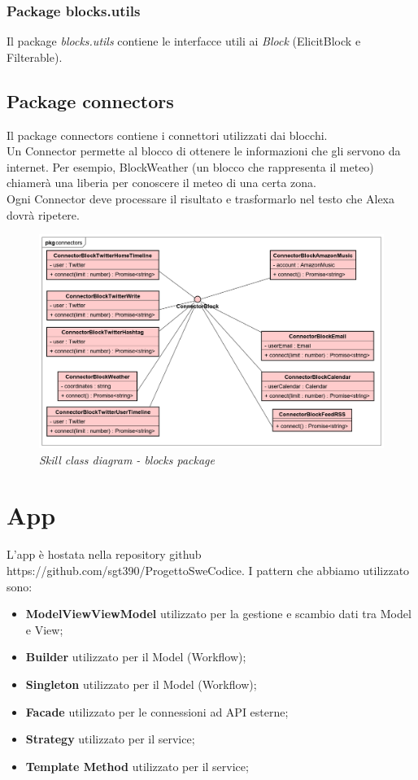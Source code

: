 \subsubsection{Package blocks.utils}
Il package \textit{blocks.utils} contiene le interfacce utili ai \textit{Block} (ElicitBlock e Filterable).
\subsection{Package connectors}
Il package connectors contiene i connettori utilizzati dai blocchi.\\
Un Connector permette al blocco di ottenere le informazioni che gli servono da internet. Per esempio, BlockWeather (un blocco che rappresenta il meteo) chiamerà una liberia per conoscere il meteo di una certa zona.\\
Ogni Connector deve processare il risultato e trasformarlo nel testo che Alexa dovrà ripetere.
\begin{figure} [H]
    \centering
	\includegraphics[scale=0.3]{./images/ZeroSevenClassConnectors.png}
	\caption{\textit{Skill class diagram - blocks package}}\label{classlambda}
\end{figure}




\section{App}\label{architetturaApp}

L'app è hostata nella repository github https://github.com/sgt390/ProgettoSweCodice.
I pattern che abbiamo utilizzato sono:
\begin{itemize}
	\item \textbf{ModelViewViewModel} utilizzato per la gestione e scambio dati tra Model e View;
	\item \textbf{Builder} utilizzato per il Model (Workflow);
	\item \textbf{Singleton} utilizzato per il Model (Workflow);
	\item \textbf{Facade} utilizzato per le connessioni ad API esterne;
	\item \textbf{Strategy} utilizzato per il service;
	\item \textbf{Template Method} utilizzato per il service;
	
	
\end{itemize}


